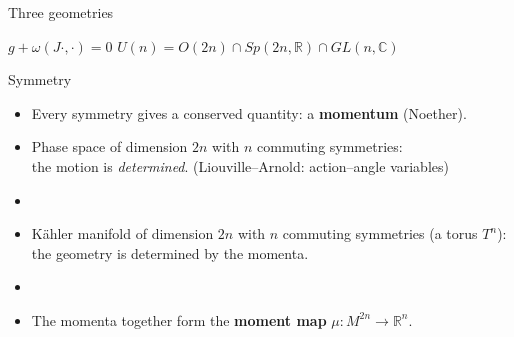 \documentclass[aspectratio=169,11pt]{beamer}
\newcommand{\R}{\mathbb{R}}
\newcommand{\C}{\mathbb{C}}
\newcommand{\hl}[1]{\textcolor{accent}{#1}}
\newcommand{\aside}[1]{{\small\color{muted}#1}}
\begin{document}

\begin{frame}{Three geometries}
  \begin{center}
  \end{center}
  \vspace{-0.6em}
  \begin{center}
    $g + \omega(J\cdot,\cdot) = 0$
    \qquad\qquad
    \aside{$U(n) = O(2n)\cap Sp(2n,\R)\cap GL(n,\C)$}
  \end{center}
\end{frame}


\begin{frame}{Symmetry}
  \begin{itemize}
    \item Every symmetry gives a conserved quantity: a \textbf{momentum} \aside{(Noether)}.
    \item Phase space of dimension $2n$ with $n$ commuting symmetries:\\
      the motion is \emph{determined}. \aside{(Liouville--Arnold: action--angle variables)}
    \item[]
    \item Kähler manifold of dimension $2n$ with $n$ commuting symmetries (a torus $T^n$):\\
      the \hl{geometry} is determined by the momenta.
    \item[]
    \item The momenta together form the \textbf{moment map} \;$\mu : M^{2n} \to \R^n$.
  \end{itemize}
\end{frame}
\end{document}
